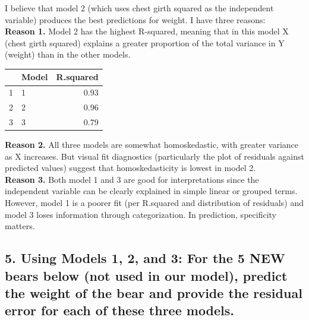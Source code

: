 \documentclass{article}
\begin{document}
I believe that model 2 (which uses chest girth squared as the independent variable) produces the best predictions for weight.  I have three reasons: \\

\noindent \textbf{Reason 1.} Model 2 has the highest R-squared, meaning that in this model X (chest girth squared) explains a greater proportion of the total variance in Y (weight) than in the other models. \\

\begin{table}[ht]
\centering
\begin{tabular}{rlr}
  \hline
 & Model & R.squared \\ 
  \hline
1 & 1 & 0.93 \\ 
  2 & 2 & 0.96 \\ 
  3 & 3 & 0.79 \\ 
   \hline
\end{tabular}
\end{table}
\noindent \textbf{Reason 2.} All three models are somewhat homoskedastic, with greater variance as X increases.  But visual fit diagnostics (particularly the plot of residuals against predicted values) suggest that homoskedasticity is lowest in model 2.\\

\noindent \textbf{Reason 3.} Both model 1 and 3 are good for interpretations since the independent variable can be clearly explained in simple linear or grouped terms.  However, model 1 is a poorer fit (per R.squared and distribution of residuals) and model 3 loses information through categorization.  In prediction, specificity matters. 





\newpage
\subsection*{5. Using Models 1, 2, and 3: For the 5 NEW bears below (not used in our model), predict the weight of the bear and provide the residual error for each of these three models.} \\
\end{document}
